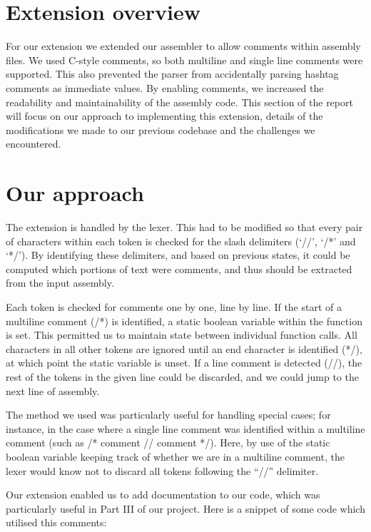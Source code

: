 \documentclass[11pt]{article}
\begin{document}
\section{Extension overview}
For our extension we extended our assembler to allow comments within assembly files. We used C-style comments, so both multiline and single line comments were supported. This also prevented the parser from accidentally parsing hashtag comments as immediate values. By enabling comments, we increased the readability and maintainability of the assembly code. This section of the report will focus on our approach to implementing this extension, details of the modifications we made to our previous codebase and the challenges we encountered.

\section{Our approach}
The extension is handled by the lexer. This had to be modified so that every pair of characters within each token is checked for the slash delimiters (‘//’, ‘/*’ and ‘*/’). By identifying these delimiters, and based on previous states, it could be computed which portions of text were comments, and thus should be extracted from the input assembly.

Each token is checked for comments one by one, line by line. If the start of a multiline comment (/*) is identified, a static boolean variable within the function is set. This permitted us to maintain state between individual function calls. All characters in all other tokens are ignored until an end character is identified (*/), at which point the static variable is unset. If a line comment is detected (//), the rest of the tokens in the given line could be discarded, and we could jump to the next line of assembly.

The method we used was particularly useful for handling special cases; for instance, in the case where a single line comment was identified within a multiline comment (such as /* comment // comment */). Here, by use of the static boolean variable keeping track of whether we are in a multiline comment, the lexer would know not to discard all tokens following the “//” delimiter.


Our extension enabled us to add documentation to our code, which was particularly useful in Part III of our project. Here is a snippet of some code which utilised this comments: 
\end{document}

